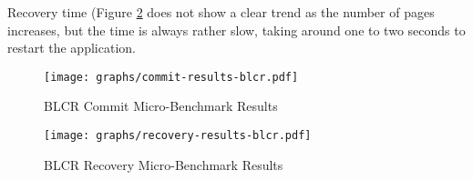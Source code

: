 Recovery time (Figure \ref{fig:blcr-recovery-ubm} does not show a clear trend
as the number of pages increases, but the time is always rather slow, taking
around one to two seconds to restart the application.

\begin{figure}[t!]
    \caption{BLCR Commit Micro-Benchmark Results}
    \texttt{[image: graphs/commit-results-blcr.pdf]}
    \label{fig:blcr-commit-ubm}
\end{figure}

\begin{figure}[t!]
    \caption{BLCR Recovery Micro-Benchmark Results}
    \texttt{[image: graphs/recovery-results-blcr.pdf]}
    \label{fig:blcr-recovery-ubm}
\end{figure}
